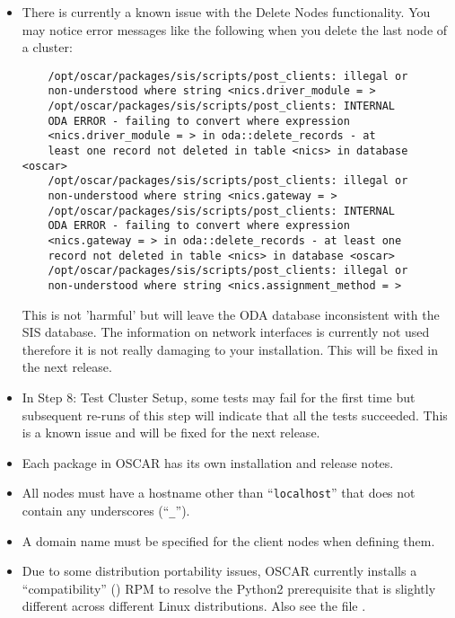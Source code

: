 \begin{itemize}

\item There is currently a known issue with the Delete Nodes functionality.
  You may notice error messages like the following when you delete the
  last node of a cluster:

  \begin{verbatim}
    /opt/oscar/packages/sis/scripts/post_clients: illegal or
    non-understood where string <nics.driver_module = >
    /opt/oscar/packages/sis/scripts/post_clients: INTERNAL
    ODA ERROR - failing to convert where expression
    <nics.driver_module = > in oda::delete_records - at 
    least one record not deleted in table <nics> in database <oscar>
    /opt/oscar/packages/sis/scripts/post_clients: illegal or
    non-understood where string <nics.gateway = >
    /opt/oscar/packages/sis/scripts/post_clients: INTERNAL
    ODA ERROR - failing to convert where expression
    <nics.gateway = > in oda::delete_records - at least one
    record not deleted in table <nics> in database <oscar>
    /opt/oscar/packages/sis/scripts/post_clients: illegal or
    non-understood where string <nics.assignment_method = >
  \end{verbatim}

  This is not 'harmful' but will leave the ODA database inconsistent
  with the SIS database.  The information on network interfaces is
  currently not used therefore it is not really damaging to your
  installation.  This will be fixed in the next release.

\item In Step 8: Test Cluster Setup, some tests may fail for the first
  time but subsequent re-runs of this step will indicate that all the
  tests succeeded.  This is a known issue and will be fixed for the next
  release.

\item Each package in OSCAR has its own installation and release
  notes.   

\item All nodes must have a hostname other than ``{\tt localhost}''
  that does not contain any underscores (``{\tt \_}'').
  
\item A domain name must be specified for the client nodes when
  defining them.

\item Due to some distribution portability issues, OSCAR currently installs
  a ``compatibility''  () RPM to resolve the
  Python2 prerequisite that is slightly different across different Linux
  distributions.  Also see the file .


\end{itemize}
